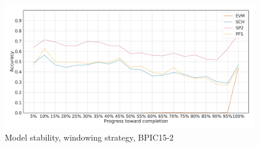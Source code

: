 \begin{figure}[!htb]
    \centering
    \includegraphics[width=\textwidth]{gfx/bpic2015_2/windowed_stability.pdf}
    \caption{Model stability, windowing strategy, BPIC15-2}
    \label{fig:bpic15-2-windowed-stability}
\end{figure}

\FloatBarrier
